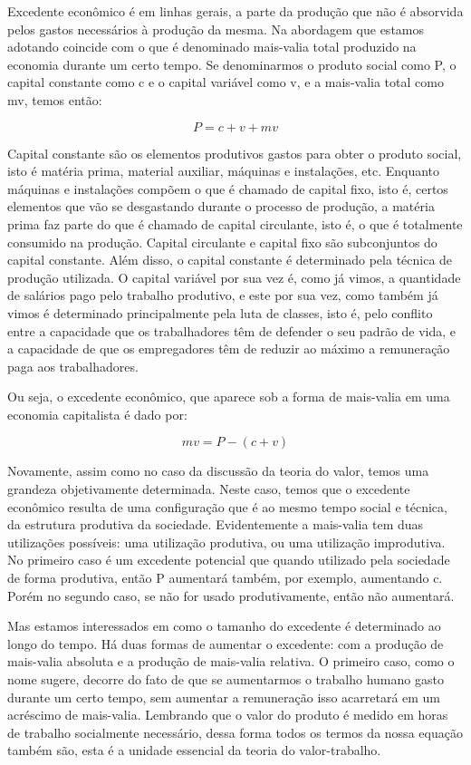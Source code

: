 Excedente econômico é em linhas gerais, a parte da produção que não é absorvida pelos gastos necessários à produção da mesma. Na abordagem que estamos adotando coincide com o que é denominado mais-valia total produzido na economia durante um certo tempo. Se denominarmos o produto social como P, o capital constante como c e o capital variável como v, e a mais-valia total como mv, temos então:

$$P=c+v+mv$$

Capital constante são os elementos produtivos gastos para obter o produto social, isto é matéria prima, material auxiliar, máquinas e  instalações, etc. Enquanto máquinas e instalações compõem o que é chamado de capital fixo, isto é, certos elementos que vão se desgastando durante o processo de produção, a matéria prima faz parte do que é chamado de capital circulante, isto é, o que é totalmente consumido na produção. Capital circulante e capital fixo são subconjuntos do capital constante. Além disso, o capital constante é determinado pela técnica de produção utilizada. O capital variável por sua vez é, como já vimos, a quantidade de salários pago pelo trabalho produtivo, e este por sua vez, como também já vimos é determinado principalmente pela luta de classes, isto é, pelo conflito entre a capacidade que os trabalhadores têm de defender o seu padrão de vida, e a capacidade de que os empregadores têm de reduzir ao máximo a remuneração paga aos trabalhadores.

Ou seja, o excedente econômico, que aparece sob a forma de mais-valia em uma economia capitalista é dado por:

$$mv=P-(c+v)$$

Novamente, assim como no caso da discussão da teoria do valor, temos uma grandeza objetivamente determinada. Neste caso, temos que o excedente econômico resulta de uma configuração que é ao mesmo tempo social e técnica, da estrutura produtiva da sociedade. Evidentemente a mais-valia tem duas utilizações possíveis: uma utilização produtiva, ou uma utilização improdutiva. No primeiro caso é um excedente potencial que quando utilizado pela sociedade de forma produtiva, então P aumentará também, por exemplo, aumentando c. Porém no segundo caso, se não for usado produtivamente, então não aumentará.

Mas estamos interessados em como o tamanho do excedente é determinado ao longo do tempo.  Há duas formas de aumentar o excedente: com a produção de mais-valia absoluta e a produção de mais-valia relativa. O primeiro caso, como o nome sugere, decorre do fato de que se aumentarmos o trabalho humano gasto durante um certo tempo, sem aumentar a remuneração isso acarretará em um acréscimo de mais-valia. Lembrando que o valor do produto é medido em horas de trabalho socialmente necessário, dessa forma todos os termos da nossa equação também são, esta é a unidade essencial da teoria do valor-trabalho.

